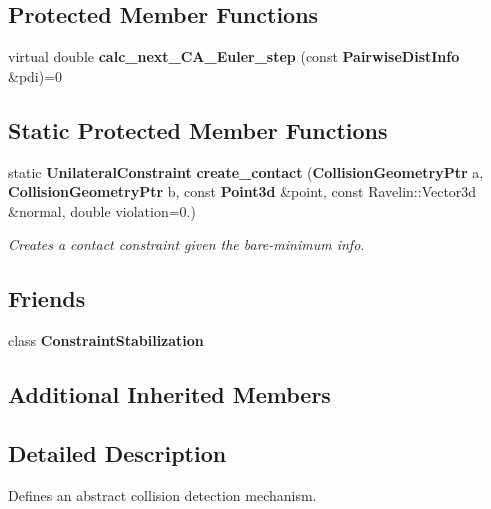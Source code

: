 \subsection*{Protected Member Functions}
\begin{DoxyCompactItemize}
\item 
virtual double {\bfseries calc\-\_\-next\-\_\-\-C\-A\-\_\-\-Euler\-\_\-step} (const {\bf Pairwise\-Dist\-Info} \&pdi)=0\label{classMoby_1_1CollisionDetection_a3823cc07abd54647134d108dc9365556}

\end{DoxyCompactItemize}
\subsection*{Static Protected Member Functions}
\begin{DoxyCompactItemize}
\item 
static {\bf Unilateral\-Constraint} {\bf create\-\_\-contact} ({\bf Collision\-Geometry\-Ptr} a, {\bf Collision\-Geometry\-Ptr} b, const {\bf Point3d} \&point, const Ravelin\-::\-Vector3d \&normal, double violation=0.)\label{classMoby_1_1CollisionDetection_ab3f1d864322a2f7f887f372570db672c}

\begin{DoxyCompactList}\small\item\em Creates a contact constraint given the bare-\/minimum info. \end{DoxyCompactList}\end{DoxyCompactItemize}
\subsection*{Friends}
\begin{DoxyCompactItemize}
\item 
class {\bfseries Constraint\-Stabilization}\label{classMoby_1_1CollisionDetection_a320e2b5d0cb83071af150f47d50ca127}

\end{DoxyCompactItemize}
\subsection*{Additional Inherited Members}


\subsection{Detailed Description}
Defines an abstract collision detection mechanism. 

